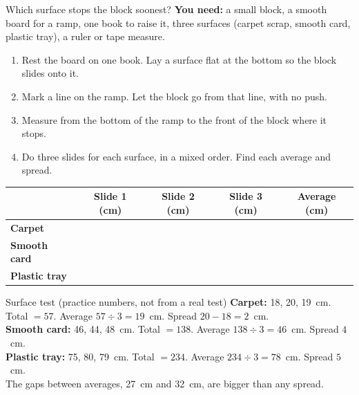 \begin{tryit}{Which surface stops the block soonest?}
\textbf{You need:} a small block, a smooth board for a ramp, one book to raise it, three surfaces (carpet scrap, smooth card, plastic tray), a ruler or tape measure.
\begin{enumerate}[leftmargin=1.6em]
\item Rest the board on one book. Lay a surface flat at the bottom so the block slides onto it.
\item Mark a line on the ramp. Let the block go from that line, with no push.
\item Measure from the bottom of the ramp to the front of the block where it stops.
\item Do three slides for each surface, in a mixed order. Find each average and spread.
\end{enumerate}
\par\medskip
\renewcommand{\arraystretch}{1.6}
\begin{tabular}{|l|c|c|c|c|}
\hline
 & \textbf{Slide 1 (cm)} & \textbf{Slide 2 (cm)} & \textbf{Slide 3 (cm)} & \textbf{Average (cm)}\\ \hline
\textbf{Carpet} & & & & \\ \hline
\textbf{Smooth card} & & & & \\ \hline
\textbf{Plastic tray} & & & & \\ \hline
\end{tabular}
\end{tryit}

\begin{worked}{Surface test (practice numbers, not from a real test)}
\textbf{Carpet:} 18, 20, 19~cm. Total $=57$. Average $57\div3=19$~cm. Spread $20-18=2$~cm.\\
\textbf{Smooth card:} 46, 44, 48~cm. Total $=138$. Average $138\div3=46$~cm. Spread $4$~cm.\\
\textbf{Plastic tray:} 75, 80, 79~cm. Total $=234$. Average $234\div3=78$~cm. Spread $5$~cm.\\
The gaps between averages, 27~cm and 32~cm, are bigger than any spread.
\end{worked}

\begin{center}
\end{center}

